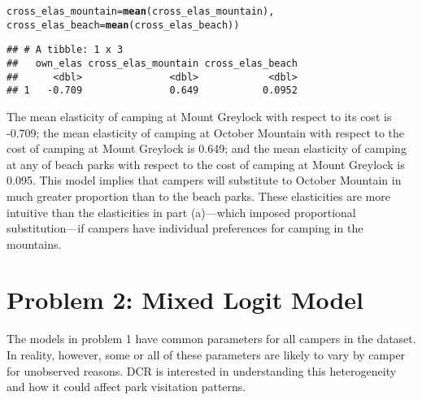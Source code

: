 \documentclass[11pt,letterpaper]{article}\usepackage[]{graphicx}\usepackage[]{color}
\makeatletter
\newcommand{\hlstd}[1]{\textcolor[rgb]{0.345,0.345,0.345}{#1}}%
\newcommand{\hlkwc}[1]{\textcolor[rgb]{0.333,0.667,0.333}{#1}}%
\newcommand{\hlkwd}[1]{\textcolor[rgb]{0.737,0.353,0.396}{\textbf{#1}}}%
\newenvironment{kframe}{%
 \def\at@end@of@kframe{}%
 \ifinner\ifhmode%
  \def\at@end@of@kframe{\end{minipage}}%
  \begin{minipage}{\columnwidth}%
 \fi\fi%
 \def\FrameCommand##1{\hskip\@totalleftmargin \hskip-\fboxsep
 \colorbox{shadecolor}{##1}\hskip-\fboxsep
     \hskip-\linewidth \hskip-\@totalleftmargin \hskip\columnwidth}%
 \MakeFramed {\advance\hsize-\width
   \@totalleftmargin\z@ \linewidth\hsize
   \@setminipage}}%
 {\par\unskip\endMakeFramed%
 \at@end@of@kframe}
\newenvironment{knitrout}{}{} %
\makeatother
\begin{document}
\begin{enumerate}[label=\alph*., leftmargin=*]
\begin{enumerate}[label=\roman*.]
\begin{knitrout}
\begin{kframe}
\begin{alltt}
            \hlkwc{cross_elas_mountain} \hlstd{=} \hlkwd{mean}\hlstd{(cross_elas_mountain),}
            \hlkwc{cross_elas_beach} \hlstd{=} \hlkwd{mean}\hlstd{(cross_elas_beach))}
\end{alltt}
\begin{verbatim}
## # A tibble: 1 x 3
##   own_elas cross_elas_mountain cross_elas_beach
##      <dbl>               <dbl>            <dbl>
## 1   -0.709               0.649           0.0952
\end{verbatim}
\end{kframe}
\end{knitrout}

		The mean elasticity of camping at Mount Greylock with respect to its cost is -0.709; the mean elasticity of camping at October Mountain with respect to the cost of camping at Mount Greylock is 0.649; and the mean elasticity of camping at any of beach parks with respect to the cost of camping at Mount Greylock is 0.095. This model implies that campers will substitute to October Mountain in much greater proportion than to the beach parks. These elasticities are more intuitive than the elasticities in part (a)---which imposed proportional substitution---if campers have individual preferences for camping in the mountains.
	\end{enumerate}
\end{enumerate}

\section*{Problem 2: Mixed Logit Model}

The models in problem 1 have common parameters for all campers in the dataset. In reality, however, some or all of these parameters are likely to vary by camper for unobserved reasons. DCR is interested in understanding this heterogeneity and how it could affect park visitation patterns.
\end{document}
